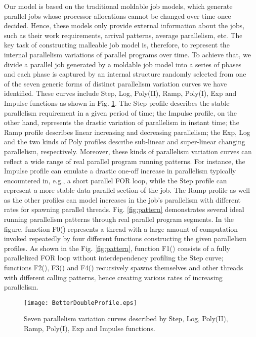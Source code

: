 \documentclass[10pt, a4paper]{article}
\begin{document}
Our model is based on the traditional moldable job models, which generate parallel jobs whose
processor allocations cannot be changed over time once decided. Hence, these models only provide
external information about the jobs, such as their work requirements, arrival patterns, average
parallelism, etc. The key task of constructing malleable job model is, therefore, to represent the
internal parallelism variations of parallel programs over time. To achieve that, we divide a
parallel job generated by a moldable job model into a series of phases and each phase is captured
by an internal structure randomly selected from one of the seven generic forms of distinct
parallelism variation curves we have identified. These curves include Step, Log, Poly(II), Ramp,
Poly(I), Exp and Impulse functions as shown in Fig. \ref{fig:profile}. The Step profile describes
the stable parallelism requirement in a given period of time; the Impulse profile, on the other
hand, represents the drastic variation of parallelism in instant time; the Ramp profile describes
linear increasing and decreasing parallelism; the Exp, Log and the two kinds of Poly profiles
describe sub-linear and super-linear changing parallelism, respectively. Moreover, these kinds of
parallelism variation curves can reflect a wide range of real parallel program running patterns.
For instance, the Impulse profile can emulate a drastic one-off increase in parallelism typically
encountered in, e.g., a short parallel FOR loop, while the Step profile can represent a more stable
data-parallel section of the job. The Ramp profile as well as the other profiles can model
increases in the job's parallelism with different rates for spawning parallel threads. Fig.
\ref{fig:pattern} demonstrates several ideal running parallelism patterns through real parallel
program segments. In the figure, function F0() represents a thread with a large amount of
computation invoked repeatedly by four different functions constructing the given parallelism
profiles. As shown in the Fig. \ref{fig:pattern}, function F1() consists of a fully parallelized
FOR loop without interdependency profiling the Step curve; functions F2(), F3() and F4()
recursively spawns themselves and other threads with different calling patterns, hence creating
various rates of increasing parallelism.

\begin{figure}[t]
\centering
    \texttt{[image: BetterDoubleProfile.eps]}
    \caption{Seven parallelism variation curves described by Step, Log, Poly(II), Ramp, Poly(I), Exp and Impulse functions.}
    \label{fig:profile}
\end{figure}
\end{document}
